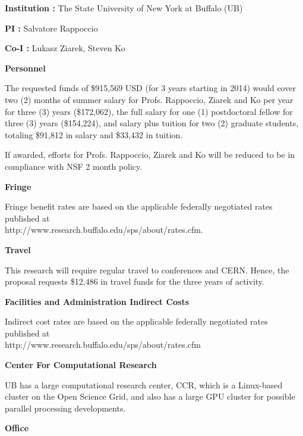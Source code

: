 \documentclass[times,11pt]{article}
\begin{document}
\newpage
{}
\renewcommand{\thepage} {B--\arabic{page}}

\bigskip
{\bf Institution : } The State University of New York at Buffalo (UB)

{\bf PI : } Salvatore Rappoccio

{\bf Co-I : } Lukasz Ziarek, Steven Ko


\bigskip
{\bf Personnel}
\bigskip


The requested funds of \$915,569 USD (for 3 years starting in 2014)
would cover two (2) months of summer salary for Profs. Rappoccio,
Ziarek and Ko per
year for three (3) years
(\$172,062), the full salary for 
one (1) postdoctoral fellow for three (3)
years (\$154,224), and salary plus
tuition for two (2) graduate students, totaling \$91,812 in
salary and \$33,432 in tuition. 

If awarded, efforts for Profs. Rappoccio, Ziarek and Ko will be
reduced to be in compliance with NSF 2 month policy. 

\bigskip
{\bf Fringe}
\bigskip


Fringe benefit rates are based on the applicable federally negotiated rates published at
\\
http://www.research.buffalo.edu/sps/about/rates.cfm.


\bigskip
{\bf Travel}
\bigskip

This research will require regular travel to conferences and
CERN. Hence, the proposal requests
\$12,486 in travel funds for the three years of activity. 

\bigskip
{\bf Facilities and Administration Indirect Costs}
\bigskip

Indirect cost rates are based on the applicable federally negotiated
rates published at 
\\
http://www.research.buffalo.edu/sps/about/rates.cfm





\newpage
{}
\renewcommand{\thepage} {C--\arabic{page}}


\bigskip
{\bf Center For Computational Research}

UB has a large computational research center, CCR, which is a
Linux-based cluster on the Open Science Grid, and also has a large GPU
cluster for possible parallel processing developments. 

\bigskip
{\bf Office}
\end{document}
